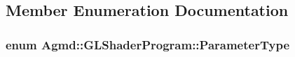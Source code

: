 \subsection{Member Enumeration Documentation}
\hypertarget{class_agmd_1_1_g_l_shader_program_ad3ee475a349c91e74f4c498c69e9d84a}{
\subsubsection[{Parameter\+Type}]{\setlength{\rightskip}{0pt plus 5cm}enum {\bf Agmd\+::\+G\+L\+Shader\+Program\+::\+Parameter\+Type}}}\label{class_agmd_1_1_g_l_shader_program_ad3ee475a349c91e74f4c498c69e9d84a}
